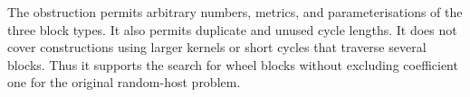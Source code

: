 The obstruction permits arbitrary numbers, metrics, and parameterisations of the three block types.
It also permits duplicate and unused cycle lengths.
It does not cover constructions using larger kernels or short cycles that traverse several blocks.
Thus it supports the search for wheel blocks without excluding coefficient one for the original random-host problem.
